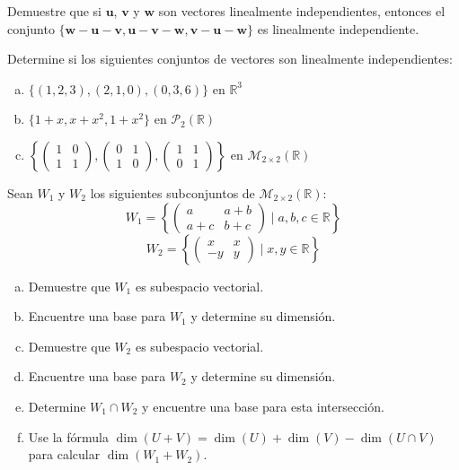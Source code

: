 \begin{prob} Demuestre que si $\mathbf{u}$, $\mathbf{v}$ y $\mathbf{w}$ son vectores linealmente independientes, entonces el conjunto $\{\mathbf{w} - \mathbf{u} - \mathbf{v}, \mathbf{u} - \mathbf{v} - \mathbf{w}, \mathbf{v} - \mathbf{u} - \mathbf{w}\}$ es linealmente independiente.
\end{prob}

\begin{prob} Determine si los siguientes conjuntos de vectores son linealmente independientes:
\begin{enumerate}[(a)]
\item $\{(1,2,3), (2,1,0), (0,3,6)\}$ en $\mathbb{R}^3$
\item $\{1 + x, x + x^2, 1 + x^2\}$ en $\mathcal{P}_2(\mathbb{R})$
\item $\left\{\begin{pmatrix} 1 & 0 \\ 1 & 1 \end{pmatrix}, \begin{pmatrix} 0 & 1 \\ 1 & 0 \end{pmatrix}, \begin{pmatrix} 1 & 1 \\ 0 & 1 \end{pmatrix}\right\}$ en $\mathcal{M}_{2 \times 2}(\mathbb{R})$
\end{enumerate}
\end{prob}



\begin{prob} Sean $W_1$ y $W_2$ los siguientes subconjuntos de $\mathcal{M}_{2 \times 2}(\mathbb{R})$:
$$W_1 = \left\{\begin{pmatrix} a & a+b \\ a+c & b+c \end{pmatrix} \mid a, b, c \in \mathbb{R}\right\}$$
$$W_2 = \left\{\begin{pmatrix} x & x \\ -y & y \end{pmatrix} \mid x, y \in \mathbb{R}\right\}$$

\begin{enumerate}[(a)]
\item Demuestre que $W_1$ es subespacio vectorial.
\item Encuentre una base para $W_1$ y determine su dimensión.
\item Demuestre que $W_2$ es subespacio vectorial.
\item Encuentre una base para $W_2$ y determine su dimensión.
\item Determine $W_1 \cap W_2$ y encuentre una base para esta intersección.
\item Use la fórmula $\dim(U + V) = \dim(U) + \dim(V) - \dim(U \cap V)$ para calcular $\dim(W_1 + W_2)$.
\end{enumerate}
\end{prob}

